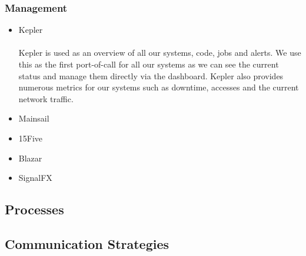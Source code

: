 \documentclass[11pt]{article} %
\begin{document}
\subsubsection{\textbf{Management}}
\begin{itemize}
\item Kepler \\\\
Kepler is used as an overview of all our systems,  code,  jobs and alerts.  We use this as the first port-of-call for all our systems as we can see the current status and manage them directly via the dashboard.  Kepler also provides numerous metrics for our systems such as downtime, accesses and the current network traffic.
\item Mainsail 
\item 15Five
\item Blazar
\item SignalFX
\end{itemize}
\subsection{Processes}
\subsection{Communication Strategies}
\end{document}
